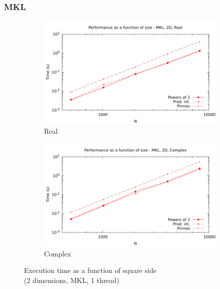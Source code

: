 \documentclass[12pt, a4paper]{article}
\begin{document}
\subsubsection{MKL}
\begin{figure}[H]
\captionsetup{width=0.8\linewidth}
\centering
\begin{subfigure}{.5\textwidth}
\centering
\includegraphics[width=.9\linewidth]{graphs/performance/2d-mkl-r.pdf}
\caption{Real}
\label{2DMKLR}
\end{subfigure}%
\begin{subfigure}{.5\textwidth}
\centering
\includegraphics[width=.9\linewidth]{graphs/performance/2d-mkl-c.pdf}
\caption{Complex}
\label{2DMKLC}
\end{subfigure}
\caption{Execution time as a function of square side\\(2 dimensions, MKL, 1 thread)}
\label{2DMKL}
\end{figure}
\end{document}
